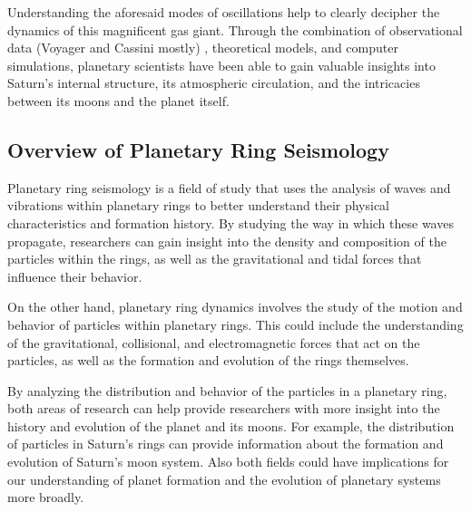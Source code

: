 \documentclass[conference]{IEEEtran}
\begin{document}
Understanding the aforesaid modes of oscillations help to clearly decipher the dynamics of this magnificent gas giant. Through the combination of observational data (Voyager and Cassini mostly) , theoretical models, and computer simulations, planetary scientists have been able to gain valuable insights into Saturn's internal structure, its atmospheric circulation, and the intricacies between its moons and the planet itself.

\subsection{Overview of Planetary Ring Seismology}

Planetary ring seismology is a field of study that uses the analysis of waves and vibrations within planetary rings to better understand their physical characteristics and formation history. By studying the way in which these waves propagate, researchers can gain insight into the density and composition of the particles within the rings, as well as the gravitational and tidal forces that influence their behavior.

On the other hand, planetary ring dynamics involves the study of the motion and behavior of particles within planetary rings. This could include the understanding of the gravitational, collisional, and electromagnetic forces that act on the particles, as well as the formation and evolution of the rings themselves.

By analyzing the distribution and behavior of the particles in a planetary ring, both areas of research can help provide researchers with more insight into the history and evolution of the planet and its moons. For example, the distribution of particles in Saturn's rings can provide information about the formation and evolution of Saturn's moon system. Also both fields could have implications for our understanding of planet formation and the evolution of planetary systems more broadly.
\end{document}
